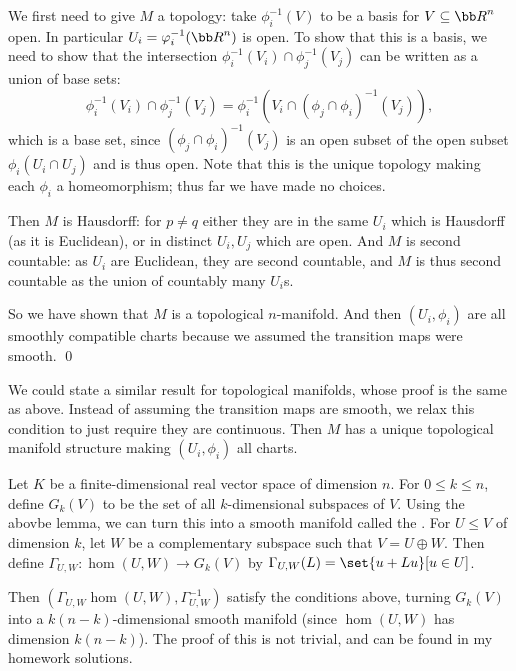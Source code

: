\elemm

\bproof

    We first need to give $M$ a topology: take $\phi_i^{-1}(V)$ to be a basis for $V\subseteq\bR^n$ open.
    In particular $U_i=\phi_i^{-1}(\bR^n)$ is open.
    To show that this is a basis, we need to show that the intersection $\phi_i^{-1}(V_i)\cap\phi_j^{-1}(V_j)$ can be written as a union of
    base sets:
    $$ \phi_i^{-1}(V_i) \cap \phi_j^{-1}(V_j) = \phi_i^{-1}(V_i\cap(\phi_j\cap\phi_i)^{-1}(V_j)) , $$
    which is a base set, since $(\phi_j\cap\phi_i)^{-1}(V_j)$ is an open subset of the open subset $\phi_i(U_i\cap U_j)$ and is thus open.
    Note that this is the unique topology making each $\phi_i$ a homeomorphism; thus far we have made no choices.

    Then $M$ is Hausdorff: for $p\neq q$ either they are in the same $U_i$ which is Hausdorff (as it is Euclidean), or in distinct $U_i,U_j$
    which are open.
    And $M$ is second countable: as $U_i$ are Euclidean, they are second countable, and $M$ is thus second countable as the union of countably
    many $U_i$s.

    So we have shown that $M$ is a topological $n$-manifold.
    And then $(U_i,\phi_i)$ are all smoothly compatible charts because we assumed the transition maps were smooth.
    \qed

\eproof

\bnote

    We could state a similar result for topological manifolds, whose proof is the same as above.
    Instead of assuming the transition maps are smooth, we relax this condition to just require they are continuous.
    Then $M$ has a unique topological manifold structure making $(U_i,\phi_i)$ all charts.

\enote

\bexam

    Let $K$ be a finite-dimensional real vector space of dimension $n$.
    For $0\leq k\leq n$, define $G_k(V)$ to be the set of all $k$-dimensional subspaces of $V$.
    Using the abovbe lemma, we can turn this into a smooth manifold called the .
    For $U\leq V$ of dimension $k$, let $W$ be a complementary subspace such that $V=U\oplus W$.
    Then define $\Gamma_{U,W}\colon\hom(U,W)\to G_k(V)$ by $\Gamma_{U,W}(L)=\set{u+Lu}[u\in U]$.

    Then $(\Gamma_{U,W}\hom(U,W),\Gamma_{U,W}^{-1})$ satisfy the conditions above, turning $G_k(V)$ into a $k(n-k)$-dimensional smooth
    manifold (since $\hom(U,W)$ has dimension $k(n-k)$).
    The proof of this is not trivial, and can be found in my homework solutions.

